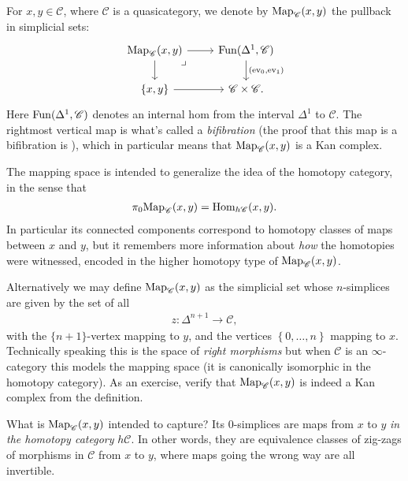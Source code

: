 \documentclass[11pt]{amsart}
\begin{document}
\begin{definition} For $x,y\in \mathscr{C}$, where $\mathscr{C}$ is a quasicategory, we denote by $\mathrm{Map}_{\mathscr{C}}(x,y)$ the pullback in simplicial sets:
\[ \begin{tikzcd}
    {\Map_{\mathscr{C}}(x,y)}\rar\dar\pb & {\Fun(\Delta^1,\mathscr{C})}\dar["{(\ev_0,\ev_1)}" right]\\
    {\{x,y\}}\rar & \mathscr{C} \times \mathscr{C}.
\end{tikzcd} \]
Here $\mathrm{Fun}(\Delta^1,\mathscr{C})$ denotes an internal hom from the interval $\Delta^1$ to $\mathscr{C}$. The rightmost vertical map is what's called a \textit{bifibration} (the proof that this map is a bifibration is \cite[2.4.7.11]{HTT}), which in particular means that $\mathrm{Map}_{\mathscr{C}}(x,y)$ is a Kan complex.
\end{definition}

\begin{intuition} The mapping space is intended to generalize the idea of the homotopy category, in the sense that
\begin{align*}
    \pi_0 \mathrm{Map}_\mathscr{C}(x,y) = \mathrm{Hom}_{h\mathscr{C}}(x,y).
\end{align*}
In particular its connected components correspond to homotopy classes of maps between $x$ and $y$, but it remembers more information about \textit{how} the homotopies were witnessed, encoded in the higher homotopy type of $\mathrm{Map}_\mathscr{C}(x,y)$.
\end{intuition}




\begin{remark} 
Alternatively we may define $\mathrm{Map}_\mathscr{C}(x,y)$ as the simplicial set whose $n$-simplices are given by the set of all
\begin{align*}
    z \colon \Delta^{n+1} \to \mathscr{C},
\end{align*}
with the $\{n+1\}$-vertex mapping to $y$, and the vertices $\left\{ 0, \ldots, n \right\}$ mapping to $x$. 
Technically speaking this is the space of \textit{right morphisms} but when $\mathscr{C}$ is an $\infty$-category this models the mapping space (it is canonically isomorphic in the homotopy category). As an exercise, verify that $\mathrm{Map}_{\mathscr{C}}(x,y)$ is indeed a Kan complex from the definition.
\end{remark}

What is $\mathrm{Map}_\mathscr{C}(x,y)$ intended to capture? Its 0-simplices are maps from $x$ to $y$ \textit{in the homotopy category} $h\mathscr{C}$. In other words, they are equivalence classes of zig-zags of morphisms in $\mathscr{C}$ from $x$ to $y$, where maps going the wrong way are all invertible.
\end{document}
